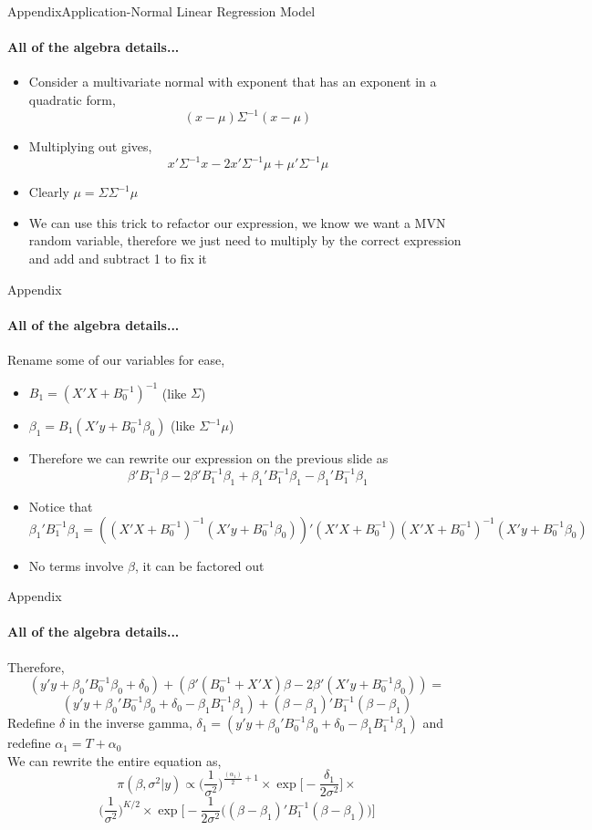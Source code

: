 \documentclass[table]{beamer}
\newcommand{\Bzero}{B_0^{-1}}
\begin{document}
\begin{frame}{Appendix}{Application-Normal Linear Regression Model}
	\framesubtitle{All of the algebra details...}
	\begin{itemize}
		\item Consider a multivariate normal with exponent that has an exponent in a quadratic form,
		\[ (x-\mu)\Sigma^{-1}(x-\mu) \]
		\item Multiplying out gives,
		\[ x'\Sigma^{-1}x - 2x'\Sigma^{-1}\mu + \mu'\Sigma^{-1}\mu \]
		\item Clearly $ \mu = \Sigma \Sigma^{-1} \mu $
		\item We can use this trick to refactor our expression, we know we want a MVN random variable, therefore we just need to multiply by the correct expression and add and subtract 1 to fix it
	\end{itemize}
\end{frame}

\begin{frame}{Appendix}
	\framesubtitle{All of the algebra details...}
	Rename some of our variables for ease, 
	\begin{itemize}
		\item $ B_1 = (X'X + \Bzero)^{-1} $ (like $ \Sigma $)
		\item $ \beta_1 =  B_1(X'y + \Bzero\beta_0) $ (like $ \Sigma^{-1}\mu $)
		\item Therefore we can rewrite our expression on the previous slide as
		\[ \beta'B_1^{-1} \beta - 2\beta' B_1^{-1}\beta_1 + \beta_1'B_1^{-1}\beta_1 - \beta_1'B_1^{-1}\beta_1 \]
		\item Notice that  $ \beta_1'B_1^{-1}\beta_1 = ( (X'X + \Bzero)^{-1} (X'y + \Bzero\beta_0) )' (X'X + \Bzero) (X'X + \Bzero)^{-1} (X'y + \Bzero\beta_0)  $
		\item No terms involve $ \beta $, it can be factored out
	\end{itemize}
\end{frame}

\begin{frame}{Appendix}
	\framesubtitle{All of the algebra details...}
	Therefore,
	\[ (y'y + \beta_0'\Bzero \beta_0 + \delta_0) +  (\beta'(\Bzero + X'X)\beta  -2\beta'(X'y + \Bzero\beta_0)) = \]
	\[ (y'y + \beta_0'\Bzero \beta_0 + \delta_0 - \beta_1 B_1^{-1}\beta_1) + (\beta-\beta_1)'B_1^{-1}(\beta-\beta_1) \]
	Redefine $ \delta $ in the inverse gamma, $ \delta_1 =  (y'y + \beta_0'\Bzero \beta_0 + \delta_0 - \beta_1 B_1^{-1}\beta_1) $ and redefine $ \alpha_1 = T + \alpha_0 $ \\
	We can rewrite the entire equation as,
	\[ \pi(\beta,\sigma^2|y) \propto  \Big(\frac{1}{\sigma^2} \Big)^{  \frac{(\alpha_1)}{2} + 1 } \times \exp\Big[ -\frac{\delta_1}{2\sigma^2}\Big] \times\] 
	\[\Big(\frac{1}{\sigma^2} \Big)^{  K/2 } \times \exp\Big[-\frac{1}{2\sigma^2}\Big((\beta-\beta_1)'B_1^{-1}(\beta-\beta_1)  \Big)\Big] \] 
\end{frame}
\end{document}
